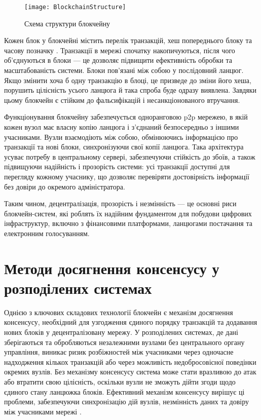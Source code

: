 \documentclass[14pt]{extreport}
\begin{document}
  \begin{figure}[H]
    \centering
    \texttt{[image: BlockchainStructure]}
    \caption{Схема структури блокчейну}
    \label{fig:blockchain}
  \end{figure}

  Кожен блок у блокчейні містить перелік транзакцій, хеш попереднього блоку та часову позначку \cite{blockchain}. Транзакції в мережі спочатку накопичуються, після чого об'єднуються в блоки — це дозволяє підвищити ефективність обробки та масштабованість системи. Блоки пов'язані між собою у послідовний ланцюг. Якщо змінити хоча б одну транзакцію в блоці, це призведе до зміни його хеша, порушить цілісність усього ланцюга й така спроба буде одразу виявлена. Завдяки цьому блокчейн є стійким до фальсифікацій і несанкціонованого втручання.

  Функціонування блокчейну забезпечується одноранговою \gls{p2p} мережею, в якій кожен вузол має власну копію ланцюга і з'єднаний безпосередньо з іншими учасниками. Вузли взаємодіють між собою, обмінюючись інформацією про транзакції та нові блоки, синхронізуючи свої копії ланцюга. Така архітектура усуває потребу в центральному сервері, забезпечуючи стійкість до збоїв, а також підвищуючи надійність і прозорість системи: усі транзакції доступні для перегляду кожному учаснику, що дозволяє перевіряти достовірність інформації без довіри до окремого адміністратора.

  Таким чином, децентралізація, прозорість і незмінність — це основні риси блокчейн-систем, які роблять їх надійним фундаментом для побудови цифрових інфраструктур, включно з фінансовими платформами, ланцюгами постачання та електронним голосуванням.

  \section{Методи досягнення консенсусу у розподілених системах}

  Однією з ключових складових технології блокчейн є механізм досягнення консенсусу, необхідний для узгодження єдиного порядку транзакцій та додавання нових блоків у децентралізовану мережу. У розподілених системах, де дані зберігаються та обробляються незалежними вузлами без центрального органу управління, виникає ризик розбіжностей між учасниками через одночасне надходження кількох транзакцій або через можливість недобросовісної поведінки окремих вузлів. Без механізму консенсусу система може стати вразливою до атак або втратити свою цілісність, оскільки вузли не зможуть дійти згоди щодо єдиного стану ланцюжка блоків. Ефективний механізм консенсусу вирішує ці проблеми, забезпечуючи синхронізацію дій вузлів, незмінність даних та довіру між учасниками мережі \cite{consensus}.
\end{document}
